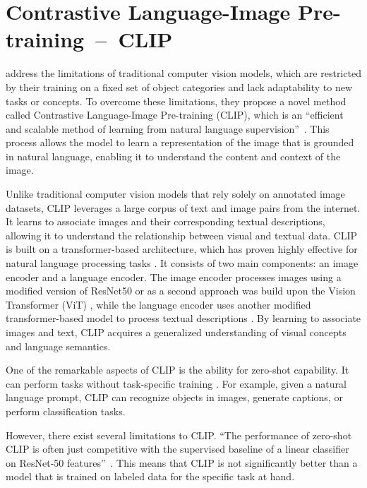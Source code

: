 \section{Contrastive Language-Image Pre-training~--~CLIP}\label{CLIP}

\citeauthor{radfordCLIP} address the limitations of traditional computer vision models, which are restricted by their training on a fixed set of object categories and lack adaptability to new tasks or concepts. To overcome these limitations, they propose a novel method called Contrastive Language-Image Pre-training (CLIP), which is an ``efficient and scalable method of learning from natural language supervision''~\citep{radfordCLIP}. This process allows the model to learn a representation of the image that is grounded in natural language, enabling it to understand the content and context of the image.

Unlike traditional computer vision models that rely solely on annotated image datasets, CLIP leverages a large corpus of text and image pairs from the internet. It learns to associate images and their corresponding textual descriptions, allowing it to understand the relationship between visual and textual data. CLIP is built on a transformer-based architecture, which has proven highly effective for natural language processing tasks \citep{radfordCLIP}. It consists of two main components: an image encoder and a language encoder. The image encoder processes images using a modified version of ResNet50 \citep{heResnet} or as a second approach was build upon the Vision Transformer (ViT) \citep{dosovitskiyViT}, while the language encoder uses another modified transformer-based model to process textual descriptions \citep{vaswani2023attention}. By learning to associate images and text, CLIP acquires a generalized understanding of visual concepts and language semantics.

One of the remarkable aspects of CLIP is the ability for zero-shot capability. It can perform tasks without task-specific training \citep{radfordCLIP}. For example, given a natural language prompt, CLIP can recognize objects in images, generate captions, or perform classification tasks.

However, there exist several limitations to CLIP\@. ``The performance of zero-shot CLIP is often just competitive with the supervised baseline of a linear classifier on ResNet-50 features''~\citep{radfordCLIP}.  This means that CLIP is not significantly better than a model that is trained on labeled data for the specific task at hand.